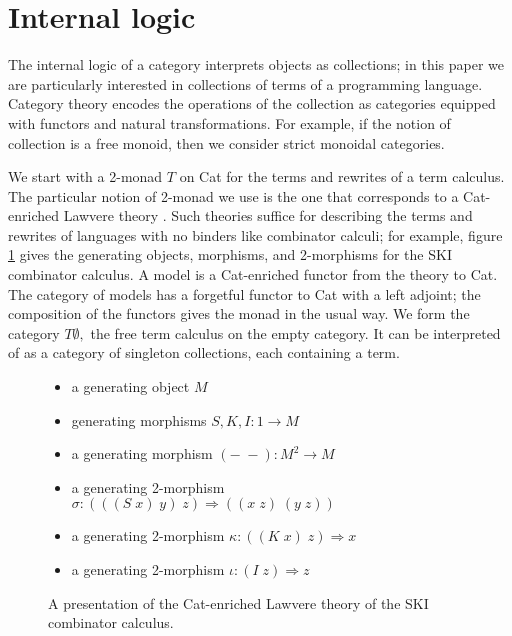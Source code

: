\documentclass[sigplan,9pt,review,anonymous]{acmart}\settopmatter{printfolios=true,printccs=false,printacmref=false}
\newcommand{\maps}{\colon}
\begin{document}
\section{Internal logic}

The internal logic of a category interprets objects as collections; in this paper we are particularly interested in collections of terms of a programming language.  Category theory encodes the operations of the collection as categories equipped with functors and natural transformations.  For example, if the notion of collection is a free monoid, then we consider strict monoidal categories.

We start with a 2-monad $T$ on Cat for the terms and rewrites of a term calculus.  The particular notion of 2-monad we use is the one that corresponds to a Cat-enriched Lawvere theory \cite{EnrichedLTs}.  Such theories suffice for describing the terms and rewrites of languages with no binders like combinator calculi; for example, figure \ref{fig:SKI} gives the generating objects, morphisms, and 2-morphisms for the SKI combinator calculus.  A model is a Cat-enriched functor from the theory to Cat.  The category of models has a forgetful functor to Cat with a left adjoint; the composition of the functors gives the monad in the usual way.  We form the category $T\emptyset,$ the free term calculus on the empty category.  It can be interpreted of as a category of singleton collections, each containing a term.

\begin{figure}
  \begin{center}
    \begin{itemize}
      \item a generating object $M$
      \item generating morphisms $S,K,I\maps 1\to M$
      \item a generating morphism $(-\;-)\maps M^2 \to M$
      \item a generating 2-morphism $\sigma\maps (((S\;x)\;y)\;z)\Rightarrow ((x\;z)\;(y\;z))$
      \item a generating 2-morphism $\kappa\maps ((K\;x)\;z)\Rightarrow x$
      \item a generating 2-morphism $\iota\maps (I\;z)\Rightarrow z$
    \end{itemize}
  \end{center}
  \caption{A presentation of the Cat-enriched Lawvere theory of the SKI combinator calculus.}
  \label{fig:SKI}
\end{figure}
\end{document}
